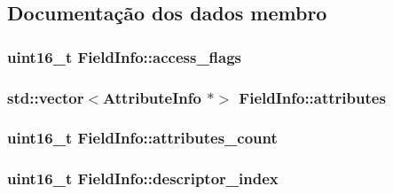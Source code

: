 \subsection{Documentação dos dados membro}
\subsubsection[{\texorpdfstring{access\+\_\+flags}{access_flags}}]{\setlength{\rightskip}{0pt plus 5cm}uint16\+\_\+t Field\+Info\+::access\+\_\+flags}\hypertarget{class_field_info_a81205117e814694f690cee6271516dc0}{}\label{class_field_info_a81205117e814694f690cee6271516dc0}
\subsubsection[{\texorpdfstring{attributes}{attributes}}]{\setlength{\rightskip}{0pt plus 5cm}std\+::vector$<${\bf Attribute\+Info} $\ast$$>$ Field\+Info\+::attributes}\hypertarget{class_field_info_ab817d700b4c5cc6f39812c9374022372}{}\label{class_field_info_ab817d700b4c5cc6f39812c9374022372}
\subsubsection[{\texorpdfstring{attributes\+\_\+count}{attributes_count}}]{\setlength{\rightskip}{0pt plus 5cm}uint16\+\_\+t Field\+Info\+::attributes\+\_\+count}\hypertarget{class_field_info_ae559a93403a28923c24eaaeabfcc63c8}{}\label{class_field_info_ae559a93403a28923c24eaaeabfcc63c8}
\subsubsection[{\texorpdfstring{descriptor\+\_\+index}{descriptor_index}}]{\setlength{\rightskip}{0pt plus 5cm}uint16\+\_\+t Field\+Info\+::descriptor\+\_\+index}\hypertarget{class_field_info_aff3935ae95047693cbe029db915944b9}{}\label{class_field_info_aff3935ae95047693cbe029db915944b9}

